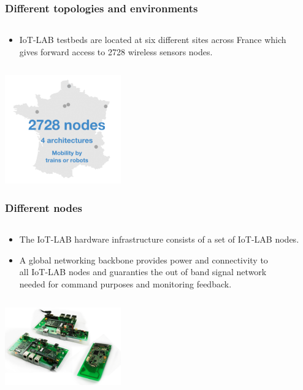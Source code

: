 \documentclass{beamer}
\begin{document}
\begin{frame}
	\frametitle{Different topologies and environments}
	\begin{columns}[c]
		\begin{column}{30cm}
			\vspace{.1cm}
			\begin{itemize}
				\justifying
				\item IoT-LAB testbeds are located at six different sites across France which\\
				gives forward access to \textcolor{TextOrange}{2728 wireless sensors nodes}.
			\end{itemize}
		\end{column}
	\end{columns}
	\vspace{.5cm}
	\hspace*{5.5cm} \includegraphics[width=5cm]{figs/iot-lab-2.png}
\end{frame}

\begin{frame}
	\frametitle{Different nodes}
	\begin{columns}[c]
		\begin{column}{30cm}
			\vspace{.1cm}
			\begin{itemize}
				\justifying
				\item The IoT-LAB hardware infrastructure consists of a set of IoT-LAB nodes.
				\item A global networking backbone provides power and connectivity to\\
				all IoT-LAB nodes and guaranties the out of band signal network\\
				needed for command purposes and monitoring feedback.
			\end{itemize}
		\end{column}
	\end{columns}
	\vspace{.5cm}
	\hspace*{5.5cm} \includegraphics[width=5cm]{figs/iot-lab-3.png}
\end{frame}
\end{document}
